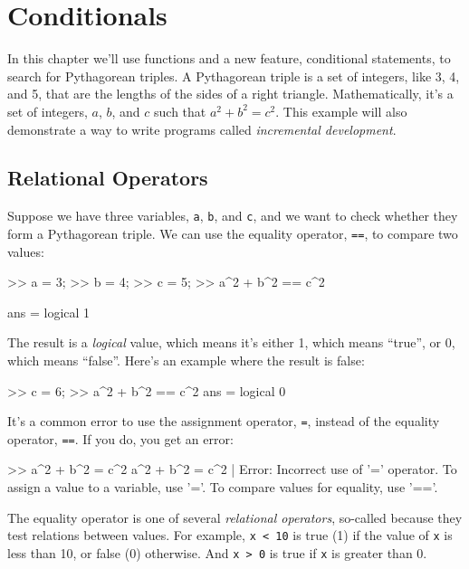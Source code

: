 \chapter{Conditionals}

In this chapter we'll use functions and a new feature, conditional statements, to search for Pythagorean triples.
A Pythagorean triple is a set of integers, like 3, 4, and 5,
that are the lengths of the sides of a right triangle.  Mathematically, it's a set of integers, $a$, $b$, and $c$ such that $a^2 + b^2 = c^2$.
This example will also demonstrate a way to write programs called {\em incremental development}.


\section{Relational Operators}

Suppose we have three variables, {\tt a}, {\tt b}, and {\tt c}, and we want to check whether they form a Pythagorean triple.  We can use the equality operator, {\tt ==}, to compare two values:

\begin{code}
>> a = 3;
>> b = 4;
>> c = 5;
>> a^2 + b^2 == c^2

ans = logical 1
\end{code}

The result is a {\em logical} value, which means it's either 1, which means ``true'', or 0, which means ``false''.  Here's an example where the result is false:

\begin{code}
>> c = 6;
>> a^2 + b^2 == c^2
ans = logical 0
\end{code}

It's a common error to use the assignment operator, {\tt =}, instead of the equality operator, {\tt ==}.  If you do, you get an error:

\begin{code}
>> a^2 + b^2 = c^2
 a^2 + b^2 = c^2
           |
Error: Incorrect use of '=' operator. 
To assign a value to a variable, use '='. 
To compare values for equality, use '=='.
\end{code}

The equality operator is one of several {\em relational operators}, so-called because they test relations between values.
For example, {\tt x < 10} is true (1) if the value of {\tt x} is less than 10, or false (0) otherwise.  And {\tt x > 0} is true if {\tt x} is greater than 0.

